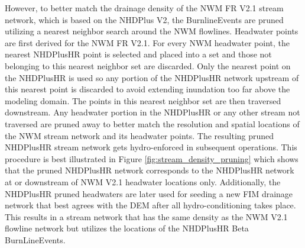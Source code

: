 \documentclass[draft]{dependencies/agujournal2019}
\begin{document}
However, to better match the drainage density of the NWM FR V2.1 stream network, which is based on the NHDPlus V2, the BurnlineEvents are pruned utilizing a nearest neighbor search around the NWM flowlines.
Headwater points are first derived for the NWM FR V2.1.
For every NWM headwater point, the nearest NHDPlusHR point is selected and placed into a set and those not belonging to this nearest neighbor set are discarded.
Only the nearest point on the NHDPlusHR is used so any portion of the NHDPlusHR network upstream of this nearest point is discarded to avoid extending inundation too far above the modeling domain.
The points in this nearest neighbor set are then traversed downstream.
Any headwater portion in the NHDPlusHR or any other stream not traversed are pruned away to better match the resolution and spatial locations of the NWM stream network and its headwater points.
The resulting pruned NHDPlusHR stream network gets hydro-enforced in subsequent operations.
This procedure is best illustrated in Figure \ref{fig:stream_density_pruning} which shows that the pruned NHDPlusHR network corresponds to the NHDPlusHR network at or downstream of NWM V2.1 headwater locations only. 
Additionally, the NHDPlusHR pruned headwaters are later used for seeding a new FIM drainage network that best agrees with the DEM after all hydro-conditioning takes place.
This results in a stream network that has the same density as the NWM V2.1 flowline network but utilizes the locations of the NHDPlusHR Beta BurnLineEvents. 
%
\end{document}
